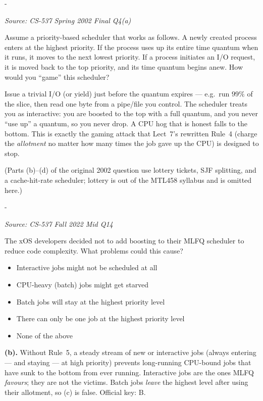 \documentclass[11pt,a4paper]{article}
\makeatletter
\newcommand{\keepspace}[1]{\par\penalty-100\begingroup
  \setlength{\dimen@}{#1}\dimen@ii\pagegoal\advance\dimen@ii-\pagetotal
  \ifdim\dimen@>\dimen@ii\ifdim\dimen@ii>\z@\vfil\fi\break\fi\endgroup}
\newcounter{qn}[section]
\newenvironment{Qn}[4]{%
  \refstepcounter{qn}\keepspace{7\baselineskip}%
  \begin{tcolorbox}[qboxstyle, title={Q\thesection.\theqn\ \ [#1 \textbar\ #2]\ \ #4}]%
  {\footnotesize\color{g3}\textit{Source: #3}}\par\smallskip%
}{%
  \end{tcolorbox}%
}
\newenvironment{Sol}{%
  \begin{tcolorbox}[sboxstyle, title={Solution}]%
}{%
  \end{tcolorbox}\vspace{0.35em}%
}
\makeatother
\begin{document}
\begin{Qn}{Hard}{Lect 7}{CS-537 Spring 2002 Final Q4(a)}{Game a naive priority scheduler with I/O-reset quanta}
Assume a priority-based scheduler that works as follows. A newly created process enters at the highest priority. If the process uses up its entire time quantum when it runs, it moves to the next lowest priority. If a process initiates an I/O request, it is moved back to the top priority, and its time quantum begins anew. How would you ``game'' this scheduler?
\end{Qn}
\begin{Sol}
Issue a trivial I/O (or yield) just before the quantum expires --- e.g.\ run $99\%$ of the slice, then read one byte from a pipe/file you control. The scheduler treats you as interactive: you are boosted to the top with a full quantum, and you never ``use up'' a quantum, so you never drop. A CPU hog that is honest falls to the bottom. This is exactly the gaming attack that Lect~7's rewritten Rule~4 (charge the \emph{allotment} no matter how many times the job gave up the CPU) is designed to stop.

(Parts (b)--(d) of the original 2002 question use lottery tickets, SJF splitting, and a cache-hit-rate scheduler; lottery is out of the MTL458 syllabus and is omitted here.)
\end{Sol}

\begin{Qn}{Medium-Hard}{Lect 7}{CS-537 Fall 2022 Mid Q14}{MLFQ without a priority boost}
The xOS developers decided not to add boosting to their MLFQ scheduler to reduce code complexity. What problems could this cause?
\begin{itemize}
  \item[(a)] Interactive jobs might not be scheduled at all
  \item[(b)] CPU-heavy (batch) jobs might get starved
  \item[(c)] Batch jobs will stay at the highest priority level
  \item[(d)] There can only be one job at the highest priority level
  \item[(e)] None of the above
\end{itemize}
\end{Qn}
\begin{Sol}
\textbf{(b).} Without Rule~5, a steady stream of new or interactive jobs (always entering --- and staying --- at high priority) prevents long-running CPU-bound jobs that have sunk to the bottom from ever running. Interactive jobs are the ones MLFQ \emph{favours}; they are not the victims. Batch jobs \emph{leave} the highest level after using their allotment, so (c) is false. Official key: B.
\end{Sol}
\end{document}
